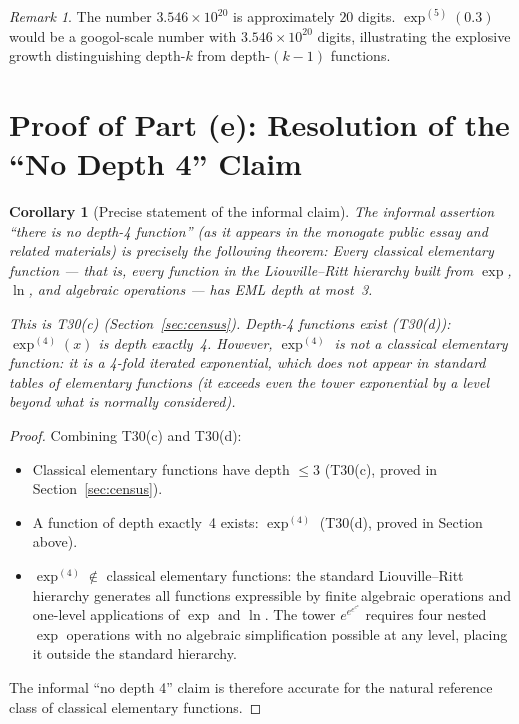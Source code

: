 \documentclass[12pt,a4paper]{article}
\newtheorem{corollary}[theorem]{Corollary}
\theoremstyle{definition}
\theoremstyle{remark}
\newtheorem{remark}[theorem]{Remark}
\begin{document}
\begin{remark}
The number $3.546\times 10^{20}$ is approximately $20$ digits.
$\exp^{(5)}(0.3)$ would be a googol-scale number with $3.546\times 10^{20}$
digits, illustrating the explosive growth distinguishing depth-$k$ from
depth-$(k-1)$ functions.
\end{remark}

\section{Proof of Part (e): Resolution of the ``No Depth 4'' Claim}

\begin{corollary}[Precise statement of the informal claim]\label{cor:nodepth4}
The informal assertion ``there is no depth-4 function'' (as it appears in the
monogate public essay and related materials) is precisely the following theorem:
\emph{Every classical elementary function — that is, every function in the
Liouville--Ritt hierarchy built from $\exp$, $\ln$, and algebraic operations —
has EML depth at most~3.}

This is T30(c) (Section~\ref{sec:census}).  Depth-4 functions exist (T30(d)):
$\exp^{(4)}(x)$ is depth exactly~4.  However, $\exp^{(4)}$ is not a classical
elementary function: it is a 4-fold iterated exponential, which does not appear
in standard tables of elementary functions (it exceeds even the tower exponential
by a level beyond what is normally considered).
\end{corollary}

\begin{proof}
Combining T30(c) and T30(d):
\begin{itemize}
  \item Classical elementary functions have depth $\leq 3$ (T30(c), proved in
        Section~\ref{sec:census}).
  \item A function of depth exactly~4 exists: $\exp^{(4)}$ (T30(d), proved in
        Section above).
  \item $\exp^{(4)}\notin$ classical elementary functions: the standard
        Liouville--Ritt hierarchy generates all functions expressible by finite
        algebraic operations and one-level applications of $\exp$ and $\ln$.
        The tower $e^{e^{e^{e^x}}}$ requires four nested $\exp$ operations with
        no algebraic simplification possible at any level, placing it outside
        the standard hierarchy.
\end{itemize}
The informal ``no depth 4'' claim is therefore accurate for the natural
reference class of classical elementary functions.
\end{proof}
\end{document}
